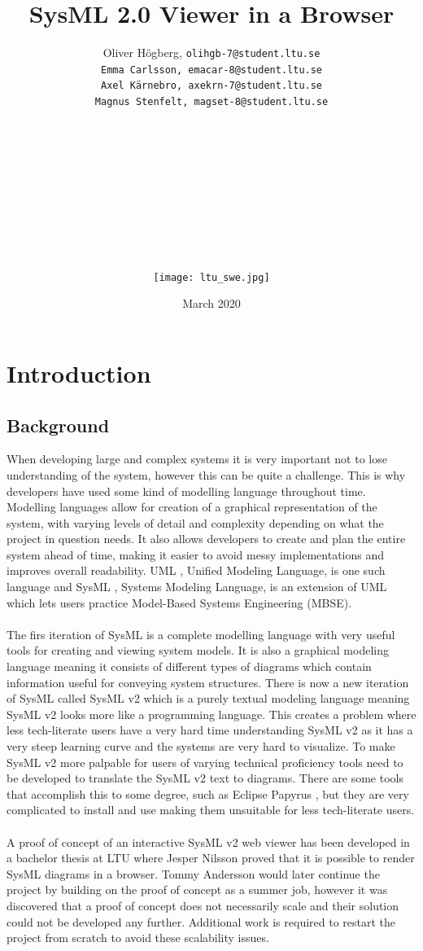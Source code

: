 \documentclass{article}
\title{SysML 2.0 Viewer in a Browser}
\author{Oliver Högberg, \tt olihgb-7@student.ltu.se \\ 
Emma Carlsson, \tt emacar-8@student.ltu.se \\ 
Axel Kärnebro, \tt axekrn-7@student.ltu.se \\ 
Magnus Stenfelt, \tt magset-8@student.ltu.se \\
\\
\\
\\
\\
\\
\\
\\
\\
\\
\\
\texttt{[image: ltu\_swe.jpg]}}
\date{March 2020}
\begin{document}
\maketitle
\newpage
\tableofcontents
\newpage

\section{Introduction}

\subsection{Background}
When developing large and complex systems it is very important not to lose understanding of the system, however this can be quite a challenge. This is why developers have used some kind of modelling language throughout time. Modelling languages allow for creation of a graphical representation of the system, with varying levels of detail and complexity depending on what the project in question needs. It also allows developers to create and plan the entire system ahead of time, making it easier to avoid messy implementations and improves overall readability. UML \cite{UML}, Unified Modeling Language, is one such language and SysML \cite{SysML}, Systems Modeling Language, is an extension of UML which lets users practice Model-Based Systems Engineering \cite{MBSE} (MBSE).
\\ \\
The firs iteration of SysML is a complete modelling language with very useful tools for creating and viewing system models. It is also a graphical modeling language meaning it consists of different types of diagrams which contain information useful for conveying system structures. There is now a new iteration of SysML called SysML v2 which is a purely textual modeling language meaning SysML v2 looks more like a programming language. This creates a problem where less tech-literate users have a very hard time understanding SysML v2 as it has a very steep learning curve and the systems are very hard to visualize. To make SysML v2 more palpable for users of varying technical proficiency tools need to be developed to translate the SysML v2 text to diagrams. There are some tools that accomplish this to some degree, such as Eclipse Papyrus \cite{EclipsePapyrus}, but they are very complicated to install and use making them unsuitable for less tech-literate users.
\\ \\
A proof of concept of an interactive SysML v2 web viewer has been developed in a bachelor thesis at LTU where Jesper Nilsson \cite{Jesper2020} proved that it is possible to render SysML diagrams in a browser. Tommy Andersson \cite{Tommy2020} would later continue the project by building on the proof of concept as a summer job, however it was discovered that a proof of concept does not necessarily scale and their solution could not be developed any further. Additional work is required to restart the project from scratch to avoid these scalability issues. 
\end{document}
